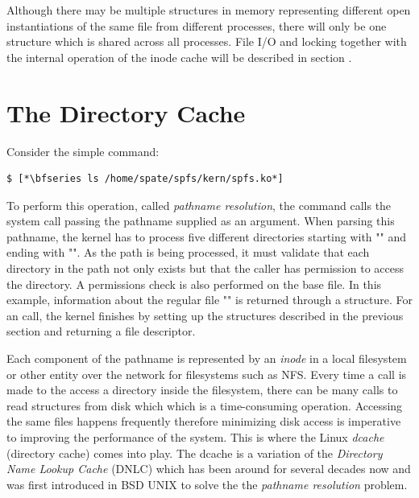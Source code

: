 \noindent
Although there may be multiple  structures in memory representing different open instantiations of the same file from different processes, there will only be one  structure which is shared across all processes. File I/O and locking together with the internal operation of the inode cache will be described in section .


\section{The Directory Cache}\label{kstruct-dcache}

Consider the simple command:

\begin{lstlisting}
$ [*\bfseries ls /home/spate/spfs/kern/spfs.ko*]
\end{lstlisting}

\noindent
To perform this operation, called \textit{pathname resolution}, the  command calls the  system call passing the pathname supplied as an argument. When parsing this pathname, the kernel has to process five different directories starting with "\cf{/}" and ending with "".  As the path is being processed, it must validate that each directory in the path not only exists but that the caller has permission to access the directory. A permissions check is also performed on the base file. In this example, information about the regular file "" is returned through a  structure. For an  call, the kernel finishes by setting up the structures described in the previous section and returning a file descriptor.

Each component of the pathname is represented by an \textit{inode} in a local filesystem or other entity over the network for filesystems such as NFS. Every time a call is made to the access a directory inside the filesystem, there can be many calls to read structures from disk which which is a time-consuming operation.  Accessing the same files happens frequently therefore minimizing disk access is imperative to improving the performance of the system. This is where the Linux \textit{dcache} (directory cache) comes into play. The dcache is a variation of the \textit{Directory Name Lookup Cache} (DNLC) which has been around for several decades now and was first introduced in BSD UNIX to solve the the \textit{pathname resolution} problem.


